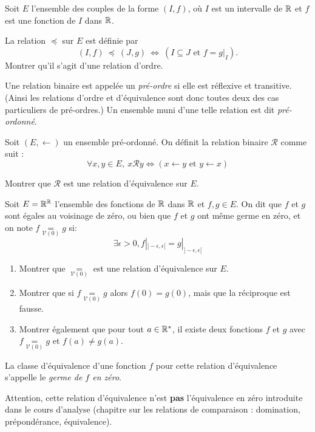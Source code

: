 \begin{exercice}
Soit $E$ l'ensemble des couples de la forme $(I,f)$, où $I$ est un intervalle de $\mathbb{R}$ et $f$ est une fonction de $I$ dans $\mathbb{R}$.

La relation $\preceq$ sur $E$ est définie par 
\[ (I,f)~\preceq~(J,g) ~\iff~ (I\subseteq J \text{ et } f=g|_I).\]
Montrer qu'il s'agit d'une relation d'ordre.
\end{exercice}

\dotfill

\begin{exercice}
Une relation binaire est appelée un \emph{pré-ordre} si elle est réflexive et transitive. (Ainsi les relations d'ordre et d'équivalence sont donc toutes deux des cas particuliers de pré-ordres.) Un ensemble muni d'une telle relation est dit \emph{pré-ordonné}.

Soit $(E,\leftarrow)$ un ensemble pré-ordonné. On définit la relation binaire $\mathcal R$ comme suit : 
\[ \forall x, y \in E, \: x\mathcal R y \iff (x\leftarrow y \text{ et } y\leftarrow x)\]

Montrer que $\mathcal R$ est une relation d'équivalence sur $E$.
\end{exercice}


\begin{exercice}
\newcommand\memegerme{\operatorname{\underset{{\scriptscriptstyle\mathcal V(0)}}{=}}}
Soit $E=\mathbb{R}^{\mathbb{R}}$ l'ensemble des fonctions de $\mathbb{R}$ dans $\mathbb{R}$ et $f, g\in E$. On dit que $f$ et $g$ sont égales au voisinage de zéro, ou bien que $f$ et $g$ ont même germe en zéro, et on note $f \memegerme g$ si:
\[  \exists \epsilon>0, f|_{]-\epsilon,\epsilon[} = g|_{]-\epsilon,\epsilon[} \]
\begin{enumerate}
\item Montrer que $\memegerme$ est une relation d'équivalence sur $E$.
\item Montrer  que si $f \memegerme g$ alors $f(0)=g(0)$, mais que la réciproque est fausse.
\item Montrer également que pour tout $a\in \mathbb{R}^*$, il existe deux fonctions $f$ et $g$ avec $f \memegerme g$ et $f(a)\neq g(a)$.
\end{enumerate}

La classe d'équivalence d'une fonction $f$ pour cette relation d'équivalence s'appelle le \emph{germe de $f$ en zéro}.

Attention, cette relation d'équivalence n'est \textbf{pas} l'équivalence en zéro introduite dans le cours d'analyse (chapitre sur les relations de comparaison : domination, prépondérance, équivalence).
\end{exercice}



